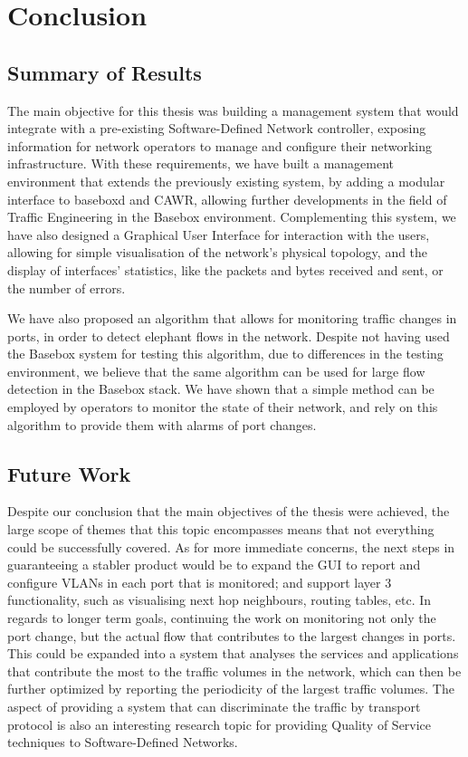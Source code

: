 \chapter{Conclusion}

\section{Summary of Results}

The main objective for this thesis was building a management system that would integrate with a pre-existing Software-Defined Network controller, exposing information
for network operators to manage and configure their networking infrastructure. With these requirements, we have built a management environment that extends the
previously existing system, by adding a modular interface to baseboxd and CAWR, allowing further developments in the field of Traffic Engineering in the Basebox
environment.  Complementing this system, we have also designed a Graphical User Interface for interaction with the users, allowing for simple visualisation of the
network's physical topology, and the display of interfaces' statistics, like the packets and bytes received and sent, or the number of errors. 

\par We have also proposed an algorithm that allows for monitoring traffic changes in ports, in order to detect elephant flows in the network. Despite not having
used the Basebox system for testing this algorithm, due to differences in the testing environment, we believe that the same algorithm can be used for large flow 
detection in the Basebox stack. We have shown that a simple method can be employed by operators to monitor the state of their network, and rely on this algorithm
to provide them with alarms of port changes.

\section{Future Work}

Despite our conclusion that the main objectives of the thesis were achieved, the large scope of themes that this topic encompasses means that not everything could be 
successfully covered. As for more immediate concerns, the next steps in guaranteeing a stabler product would be to expand the GUI to report and configure VLANs in 
each port that is monitored; and support layer 3 functionality, such as visualising next hop neighbours, routing tables, etc. In regards to longer term goals, 
continuing the work on monitoring not only the port change, but the actual flow that contributes to the largest changes in ports. This could be expanded into a
system that analyses the services and applications that contribute the most to the traffic volumes in the network, which can then be further optimized by reporting
the periodicity of the largest traffic volumes. The aspect of providing a system that can discriminate the traffic by transport protocol is also an interesting
research topic for providing Quality of Service techniques to Software-Defined Networks.

